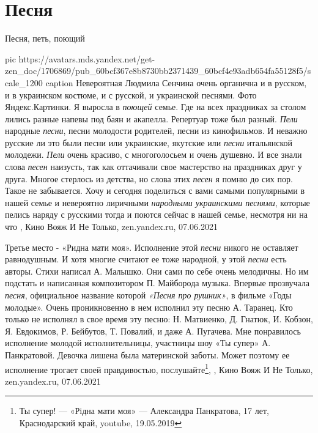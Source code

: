  
 
 
 
 
\chapter{Песня}
\label{sec:slova.pesnja}

Песня, петь, поющий

\ifcmt
  pic https://avatars.mds.yandex.net/get-zen_doc/1706869/pub_60bcf367e8b8730bb2371439_60bcf4e93adb654fa55128f5/scale_1200
	caption Невероятная Людмила Сенчина очень органична и в русском, и в украинском костюме, и с русской, и украинской песнями. Фото Яндекс.Картинки.
\fi
Я выросла в \emph{поющей} семье. Где на всех праздниках за столом лились разные напевы
под баян и акапелла. Репертуар тоже был разный. \emph{Пели} народные \emph{песни}, песни
молодости родителей, песни из кинофильмов. И неважно русские ли это были песни
или украинские, якутские или \emph{песни} итальянской молодежи. \emph{Пели} очень красиво, с
многоголосьем и очень душевно. И все знали слова \emph{песен} наизусть, так как
оттачивали свое мастерство на праздниках друг у друга.  Многое стерлось из
детства, но слова этих \emph{песен} я помню до сих пор. Такое не забывается.  Хочу и
сегодня поделиться с вами самыми популярными в нашей семье и невероятно
лиричными \emph{народными украинскими песнями}, которые пелись наряду с русскими тогда
и поются сейчас в нашей семье, несмотря ни на что
, 
Кино Вояж И Не Только, zen.yandex.ru, 07.06.2021

Третье место - «Ридна мати моя». Исполнение этой \emph{песни} никого не
оставляет равнодушным. И хотя многие считают ее тоже народной, у этой
\emph{песни} есть авторы. Стихи написал А. Малышко. Они сами по себе очень
мелодичны. Но им подстать и написанная композитором П. Майборода музыка.
Впервые прозвучала \emph{песня}, официальное название которой \emph{«Песня про
рушник»}, в фильме «Годы молодые». Очень проникновенно в нем исполнил эту песню
А. Таранец. Кто только не исполнял в свое время эту песню: Н. Матвиенко, Д.
Гнатюк, И. Кобзон, Я. Евдокимов, Р. Бейбутов, Т. Повалий, и даже А. Пугачева.
Мне понравилось исполнение молодой исполнительницы, участницы шоу «Ты супер» А.
Панкратовой. Девочка лишена была материнской заботы. Может поэтому ее
исполнение трогает своей правдивостью, послушайте\footnote{Ты супер! — «Рiдна
мати моя» — Александра Панкратова, 17 лет, Краснодарский край, youtube,
19.05.2019},
, 
Кино Вояж И Не Только, zen.yandex.ru, 07.06.2021


